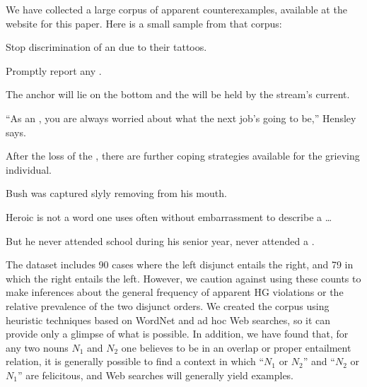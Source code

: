\documentclass{article}
\begin{document}
We have collected a large corpus of apparent counterexamples,
available at the website for this paper. Here is a small sample from
that corpus:
%
\begin{examples}
\item\label{ourcorpus} 
  \begin{examples}
  \item Stop discrimination of an  due
    to their tattoos.
  \item Promptly report any .
  \item The anchor will lie on the bottom and the  will be held by the stream's current.
  \item ``As an , you are always worried
    about what the next job's going to be,'' Hensley says.
  \item After the loss of the , there are
    further coping strategies available for the grieving individual.
  \item Bush was captured slyly removing 
    from his mouth.
  \item Heroic is not a word one uses often without embarrassment to
    describe a  \ldots
  \item But he never attended school during his senior year, never
    attended a .
  \end{examples}
\end{examples}

The dataset includes 90 cases where the left disjunct entails the
right, and 79 in which the right entails the left.  However, we
caution against using these counts to make inferences about the
general frequency of apparent HG violations or the relative prevalence
of the two disjunct orders. We created the corpus using heuristic
techniques based on WordNet and ad hoc Web searches, so it can provide
only a glimpse of what is possible.  In addition, we have found that,
for any two nouns $N_{1}$ and $N_{2}$ one believes to be in an overlap
or proper entailment relation, it is generally possible to find a
context in which ``$N_{1}$ or $N_{2}$'' and ``$N_{2}$ or $N_{1}$'' are
felicitous, and Web searches will generally yield examples.
\end{document}
